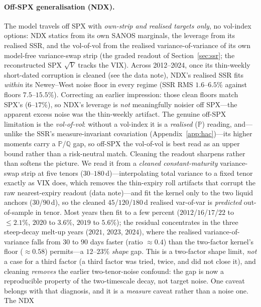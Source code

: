 \documentclass[11pt]{article}
\begin{document}
\paragraph{Off-SPX generalisation (NDX).} The model travels off SPX with \emph{own-strip and realised targets only}, no vol-index
options: NDX statics from its own SANOS marginals, the leverage from its realised SSR, and the vol-of-vol
from the realised variance-of-variance of its own model-free variance-swap strip (the graded readout of
Section~\ref{sec:ssr}; the reconstructed SPX $\sqrt V$ tracks the VIX). Across 2012--2024, once its thin-weekly
short-dated corruption is cleaned (see the data note), NDX's realised SSR fits \emph{within} its
Newey--West noise floor in every regime (SSR RMS $1.6$--$6.5\%$ against floors $7.5$--$15.5\%$). Correcting an
earlier impression: those clean floors match SPX's ($6$--$17\%$), so NDX's
leverage is \emph{not} meaningfully noisier off SPX---the apparent excess noise was the thin-weekly artifact.
The genuine off-SPX limitation is the \emph{vol-of-vol}: without a vol-index it is a \emph{realised}
($\mathbb P$) reading, and---unlike the SSR's measure-invariant covariation (Appendix~\ref{app:hac})---its
higher moments carry a $\mathbb P$/$\mathbb Q$ gap, so off-SPX the vol-of-vol is best read as an upper bound
rather than a risk-neutral match. Cleaning the readout sharpens rather than
softens the picture. We read it from a \emph{cleaned constant-maturity} variance-swap strip at five tenors
($30$--$180$\,d)---interpolating total variance to a fixed tenor exactly as VIX does, which removes the
thin-expiry roll artifacts that corrupt the raw nearest-expiry readout (data note)---and fit the kernel only
to the two liquid anchors ($30$/$90$\,d), so the cleaned $45$/$120$/$180$\,d realised var-of-var is
\emph{predicted} out-of-sample in tenor. Most years then fit to a few percent
($2012$/$16$/$17$/$22$ to ${\le}2.1\%$, $2020$ to $3.6\%$, $2019$ to $5.6\%$); the residual concentrates in the
three steep-decay melt-up years ($2021$, $2023$, $2024$), where the realised
variance-of-variance falls from $30$ to $90$ days faster (ratio ${\approx}0.4$) than the two-factor kernel's
floor (${\approx}0.58$) permits---a $12$--$23\%$ \emph{shape} gap. This is a two-factor shape limit, \emph{not}
a case for a third factor (a third factor was tried, twice, and did not close it), and cleaning
\emph{removes} the earlier two-tenor-noise confound: the gap is now a reproducible property of the
two-timescale decay, not target noise.
One caveat belongs with that diagnosis, and it is a \emph{measure} caveat rather than a noise one. The NDX
\end{document}
